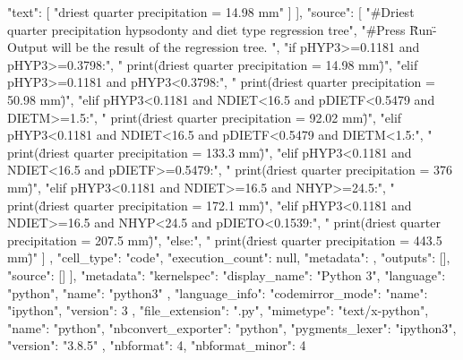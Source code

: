 {{{     "text": [
      "driest quarter precipitation = 14.98 mm\n"
     ]
    }
   ],
   "source": [
    "#Driest quarter precipitation hypsodonty and diet type regression tree\n",
    "#Press \"Run\" - Output will be the result of the regression tree. \n",
    "if pHYP3>=0.1181 and pHYP3>=0.3798:\n",
    "    print(\"driest quarter precipitation = 14.98 mm\")\n",
    "elif pHYP3>=0.1181 and pHYP3<0.3798:\n",
    "    print(\"driest quarter precipitation = 50.98 mm\")\n",
    "elif pHYP3<0.1181 and NDIET<16.5 and pDIETF<0.5479 and DIETM>=1.5:\n",
    "    print(\"driest quarter precipitation = 92.02 mm\")\n",
    "elif pHYP3<0.1181 and NDIET<16.5 and pDIETF<0.5479 and DIETM<1.5:\n",
    "    print(\"driest quarter precipitation = 133.3 mm\")\n",
    "elif pHYP3<0.1181 and NDIET<16.5 and pDIETF>=0.5479:\n",
    "    print(\"driest quarter precipitation = 376 mm\")\n",
    "elif pHYP3<0.1181 and NDIET>=16.5 and NHYP>=24.5:\n",
    "    print(\"driest quarter precipitation = 172.1 mm\")\n",
    "elif pHYP3<0.1181 and NDIET>=16.5 and NHYP<24.5 and pDIETO<0.1539:\n",
    "    print(\"driest quarter precipitation = 207.5 mm\")\n",
    "else:\n",
    "    print(\"driest quarter precipitation = 443.5 mm\")"
   ]
  },
  {
   "cell_type": "code",
   "execution_count": null,
   "metadata": {},
   "outputs": [],
   "source": []
  }
 ],
 "metadata": {
  "kernelspec": {
   "display_name": "Python 3",
   "language": "python",
   "name": "python3"
  },
  "language_info": {
   "codemirror_mode": {
    "name": "ipython",
    "version": 3
   },
   "file_extension": ".py",
   "mimetype": "text/x-python",
   "name": "python",
   "nbconvert_exporter": "python",
   "pygments_lexer": "ipython3",
   "version": "3.8.5"
  }
 },
 "nbformat": 4,
 "nbformat_minor": 4
}
